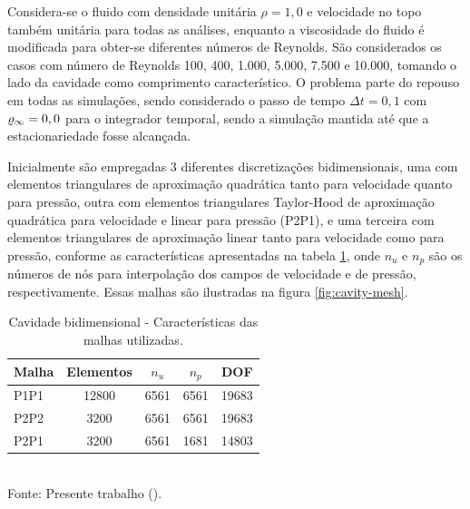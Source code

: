 Considera-se o fluido com densidade unitária $\rho=1,0$ e velocidade no topo também unitária para todas as análises, enquanto a viscosidade do fluido é modificada para obter-se diferentes números de Reynolds. São considerados os casos com número de Reynolds 100, 400, 1.000, 5.000, 7.500 e 10.000, tomando o lado da cavidade como comprimento característico. O problema parte do repouso em todas as simulações, sendo considerado o passo de tempo $\Delta t=0,1$ com $\varrho_\infty=0,0$ para o integrador temporal, sendo a simulação mantida até que a estacionariedade fosse alcançada.

Inicialmente são empregadas 3 diferentes discretizações bidimensionais, uma com elementos triangulares de aproximação quadrática tanto para velocidade quanto para pressão, outra com elementos triangulares Taylor-Hood de aproximação quadrática para velocidade e linear para pressão (P2P1), e uma terceira com elementos triangulares de aproximação linear tanto para velocidade como para pressão, conforme as características apresentadas na tabela \ref{tab:cavity-mesh}, onde $n_u$ e $n_p$ são os números de nós para interpolação dos campos de velocidade e de pressão, respectivamente. Essas malhas são ilustradas na figura \ref{fig:cavity-mesh}.

\begin{table}[h!]
    \centering
    \caption{Cavidade bidimensional - Características das malhas utilizadas.}
    \begin{tabular}{lcccc}
        \hline
        Malha & Elementos & $n_u$ & $n_p$ & DOF   \\\hline
        P1P1  & 12800     & 6561  & 6561  & 19683 \\
        P2P2  & 3200      & 6561  & 6561  & 19683 \\
        P2P1  & 3200      & 6561  & 1681  & 14803 \\\hline
    \end{tabular}
    \\Fonte: Presente trabalho (\the\year).
    \label{tab:cavity-mesh}
\end{table}

